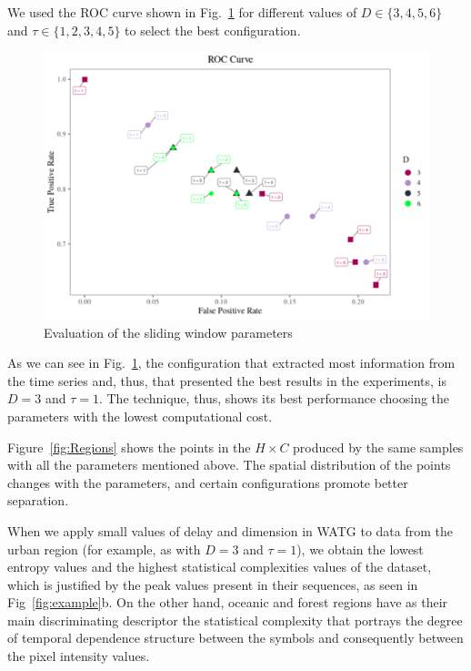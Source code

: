 \documentclass[journal]{IEEEtran}
\begin{document}
We used the ROC curve shown in Fig.~\ref{fig:ROC} for different values of $D \in \{3, 4, 5, 6 \} $ and $\tau \in \{1, 2, 3, 4, 5 \}$ to select the best configuration.

\begin{figure}[hbt]
	\includegraphics[width=\columnwidth]{Figures/ROC.pdf}	\caption{Evaluation of the sliding window parameters}
	\label{fig:ROC}
\end{figure} 

As we can see in Fig.~\ref{fig:ROC}, the configuration that extracted most information from the time series and, thus, that presented the best results in the experiments, is $ D = 3 $ and $ \tau = 1 $.
The technique, thus, shows its best performance choosing the parameters with the lowest computational cost.

Figure~\ref{fig:Regions} shows the points in the $H\times C$ produced by the same samples with all the parameters mentioned above.
The spatial distribution of the points changes with the parameters,
and certain configurations promote better separation.


When we apply small values of delay and dimension in WATG to data from the urban region (for example, as with $ D = 3 $ and $ \tau = 1 $), we obtain the lowest entropy values and the highest statistical complexities values of the dataset, which is justified by the peak values present in their sequences, as seen in Fig~\ref{fig:example}b.
On the other hand, oceanic and forest regions have as their main discriminating descriptor the statistical complexity that portrays the degree of temporal dependence structure between the symbols and consequently between the pixel intensity values.
\end{document}
